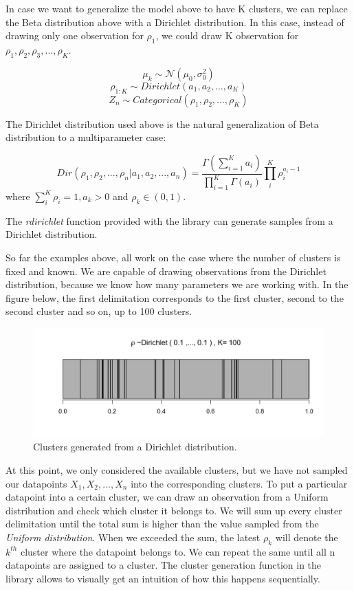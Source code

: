 \documentclass[12pt,a4paper]{article}
\begin{document}
In case we want to generalize the model above to have K clusters, we can replace the Beta distribution above with a Dirichlet distribution. In this case, instead of drawing only one observation for $\rho_{1}$, we could draw K observation for $\rho_{1}, \rho_{2}, \rho_{3}, ..., \rho_{K}$.

$$\mu_{k} \sim \mathcal{N}(\mu_{0}, \sigma_{0}^2)$$ 
$$\rho_{1:K} \sim Dirichlet(a_{1}, a_{2}, ..., a_{K})$$
$$Z_{n} \sim Categorical(\rho_{1}, \rho_{2}, ... ,\rho_{K})$$

The Dirichlet distribution used above is the natural generalization of Beta distribution to a multiparameter case:

$$ Dir(\rho_{1}, \rho_{2}, ..., \rho_{n}| a_{1}, a_{2}, ..., a_{n}) = \frac{\Gamma(\sum_{i=1}^{K}a_{i})}{\prod_{i=1}^{K}\Gamma(a_{i})}\prod_{i}^{K}\rho_{i}^{a_{i} - 1}$$ where
$\sum_{i}^{K} \rho_{i} = 1, a_{k} > 0$ and $\rho_{k} \in (0, 1)$.

The \textit{rdirichlet} function provided with the library can generate samples from a Dirichlet distribution.

So far the examples above, all work on the case where the number of clusters is fixed and known. We are capable of drawing observations from the Dirichlet distribution, because we know how many parameters we are working with. In the figure below, the first delimitation corresponds to the first cluster, second to the second cluster and so on, up to 100 clusters.

\begin{figure} [H]
    \begin{center}
        \includegraphics[scale=1, width=13cm]{stacked_dirichlet.png}
        \caption{Clusters generated from a Dirichlet distribution.}
        \label{fig:stacked_dirichlet}
    \end{center}
\end{figure}

At this point, we only considered the available clusters, but we have not sampled our datapoints $X_{1}, X_{2}, ..., X_{n}$ into the corresponding clusters. To put a particular datapoint into a certain cluster, we can draw an observation from a Uniform distribution and check which cluster it belongs to. We will sum up every cluster delimitation until the total sum is higher than the value sampled from the \textit{Uniform distribution}. When we exceeded the sum, the latest $\rho_{k}$ will denote the $k^{th}$ cluster where the datapoint belongs to. We can repeat the same until all n datapoints are assigned to a cluster. The cluster generation function in the library allows to visually get an intuition of how this happens sequentially. 
\end{document}
